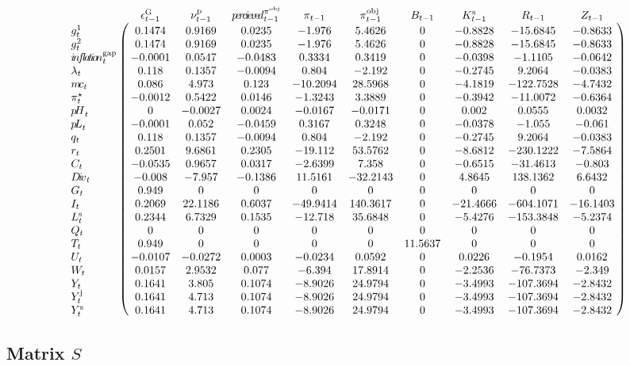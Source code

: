 $$\bordermatrix{
~ & \epsilon^{\mathrm{G}}_{t-1} & \nu^{\mathrm{p}}_{t-1} & {p\!e\!r\!c\!i\!e\!v\!e\!d}^{\pi^{\mathrm{obj}}}_{t-1} & \pi_{t-1} & \pi^{\mathrm{obj}}_{t-1} & B_{t-1} & K^{\mathrm{s}}_{t-1} & R_{t-1} & Z_{t-1} \cr
g^{\mathrm{1}}_{t} & 0.1474 & 0.9169 & 0.0235 & -1.976 & 5.4626 & 0 & -0.8828 & -15.6845 & -0.8633 \cr
g^{\mathrm{2}}_{t} & 0.1474 & 0.9169 & 0.0235 & -1.976 & 5.4626 & 0 & -0.8828 & -15.6845 & -0.8633 \cr
{i\!n\!f\!l\!a\!t\!i\!o\!n}^{\mathrm{gap}}_{t} & -0.0001 & 0.0547 & -0.0483 & 0.3334 & 0.3419 & 0 & -0.0398 & -1.1105 & -0.0642 \cr
\lambda_{t} & 0.118 & 0.1357 & -0.0094 & 0.804 & -2.192 & 0 & -0.2745 & 9.2064 & -0.0383 \cr
{m\!c}_{t} & 0.086 & 4.973 & 0.123 & -10.2094 & 28.5968 & 0 & -4.1819 & -122.7528 & -4.7432 \cr
\pi^{\star}_{t} & -0.0012 & 0.5422 & 0.0146 & -1.3243 & 3.3889 & 0 & -0.3942 & -11.0072 & -0.6364 \cr
{p\!H}_{t} & 0 & -0.0027 & 0.0024 & -0.0167 & -0.0171 & 0 & 0.002 & 0.0555 & 0.0032 \cr
{p\!L}_{t} & -0.0001 & 0.052 & -0.0459 & 0.3167 & 0.3248 & 0 & -0.0378 & -1.055 & -0.061 \cr
q_{t} & 0.118 & 0.1357 & -0.0094 & 0.804 & -2.192 & 0 & -0.2745 & 9.2064 & -0.0383 \cr
r_{t} & 0.2501 & 9.6861 & 0.2305 & -19.112 & 53.5762 & 0 & -8.6812 & -230.1222 & -7.5864 \cr
C_{t} & -0.0535 & 0.9657 & 0.0317 & -2.6399 & 7.358 & 0 & -0.6515 & -31.4613 & -0.803 \cr
{D\!i\!v}_{t} & -0.008 & -7.957 & -0.1386 & 11.5161 & -32.2143 & 0 & 4.8645 & 138.1362 & 6.6432 \cr
G_{t} & 0.949 & 0 & 0 & 0 & 0 & 0 & 0 & 0 & 0 \cr
I_{t} & 0.2069 & 22.1186 & 0.6037 & -49.9414 & 140.3617 & 0 & -21.4666 & -604.1071 & -16.1403 \cr
L^{\mathrm{s}}_{t} & 0.2344 & 6.7329 & 0.1535 & -12.718 & 35.6848 & 0 & -5.4276 & -153.3848 & -5.2374 \cr
Q_{t} & 0 & 0 & 0 & 0 & 0 & 0 & 0 & 0 & 0 \cr
T_{t} & 0.949 & 0 & 0 & 0 & 0 & 11.5637 & 0 & 0 & 0 \cr
U_{t} & -0.0107 & -0.0272 & 0.0003 & -0.0234 & 0.0592 & 0 & 0.0226 & -0.1954 & 0.0162 \cr
W_{t} & 0.0157 & 2.9532 & 0.077 & -6.394 & 17.8914 & 0 & -2.2536 & -76.7373 & -2.349 \cr
Y_{t} & 0.1641 & 3.805 & 0.1074 & -8.9026 & 24.9794 & 0 & -3.4993 & -107.3694 & -2.8432 \cr
Y^{\mathrm{j}}_{t} & 0.1641 & 4.713 & 0.1074 & -8.9026 & 24.9794 & 0 & -3.4993 & -107.3694 & -2.8432 \cr
Y^{\mathrm{s}}_{t} & 0.1641 & 4.713 & 0.1074 & -8.9026 & 24.9794 & 0 & -3.4993 & -107.3694 & -2.8432 \cr
}$$

\subsection*{Matrix $S$}


